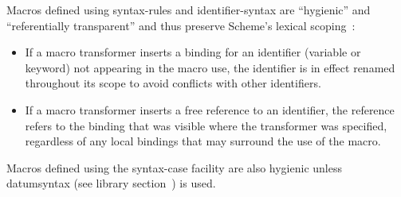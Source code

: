 Macros defined using {\cf syntax-rules} and {\cf identifier-\linebreak[0]syntax}
are ``hygienic'' and ``referentially transparent'' and thus preserve
Scheme's lexical scoping~\cite{Kohlbecker86,
  hygienic,Bawden88,macrosthatwork,syntacticabstraction}:
 

\begin{itemize}
\item If a macro transformer inserts a binding for an identifier
(variable or keyword) not appearing in the macro use, the identifier is in effect renamed
throughout its scope to avoid conflicts with other identifiers.

\item If a macro transformer inserts a free reference to an
identifier, the reference refers to the binding that was visible
where the transformer was specified, regardless of any local
bindings that may surround the use of the macro.
\end{itemize}

Macros defined using the {\cf syntax-case} facility are also
hygienic unless {\cf datum\coerce{}syntax}
(see library section~) is used.

